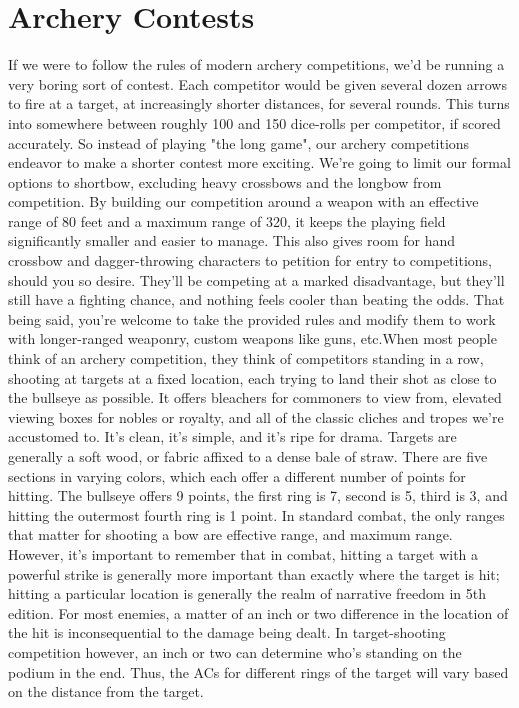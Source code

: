\documentclass[10pt,a4paper,twoside,bg=print,twocolumn,openany,nodeprecatedcode]{dndbook}
\begin{document}
\section{Archery Contests}
If we were to follow the rules of modern archery competitions, we'd be running a very boring sort of contest. Each competitor would be given several dozen arrows to fire at a target, at increasingly shorter distances, for several rounds. This turns into somewhere between roughly 100 and 150 dice-rolls per competitor, if scored accurately. So instead of playing "the long game", our archery competitions endeavor to make a shorter contest more exciting.
We're going to limit our formal options to shortbow, excluding heavy crossbows and the longbow from competition. By building our competition around a weapon with an effective range of 80 feet and a maximum range of 320, it keeps the playing field significantly smaller and easier to manage. This also gives room for hand crossbow and dagger-throwing characters to petition for entry to competitions, should you so desire. They'll be competing at a marked disadvantage, but they'll still have a fighting chance, and nothing feels cooler than beating the odds.
That being said, you're welcome to take the provided rules and modify them to work with longer-ranged weaponry, custom weapons like guns, etc.When most people think of an archery competition, they think of competitors standing in a row, shooting at targets at a fixed location, each trying to land their shot as close to the bullseye as possible. It offers bleachers for commoners to view from, elevated viewing boxes for nobles or royalty, and all of the classic cliches and tropes we're accustomed to. It's clean, it's simple, and it's ripe for drama.
Targets are generally a soft wood, or fabric affixed to a dense bale of straw. There are five sections in varying colors, which each offer a different number of points for hitting. The bullseye offers 9 points, the first ring is 7, second is 5, third is 3, and hitting the outermost fourth ring is 1 point.
In standard combat, the only ranges that matter for shooting a bow are effective range, and maximum range. However, it's important to remember that in combat, hitting a target with a powerful strike is generally more important than exactly where the target is hit; hitting a particular location is generally the realm of narrative freedom in 5th edition. For most enemies, a matter of an inch or two difference in the location of the hit is inconsequential to the damage being dealt. In target-shooting competition however, an inch or two can determine who's standing on the podium in the end. Thus, the ACs for different rings of the target will vary based on the distance from the target. 
\end{document}
